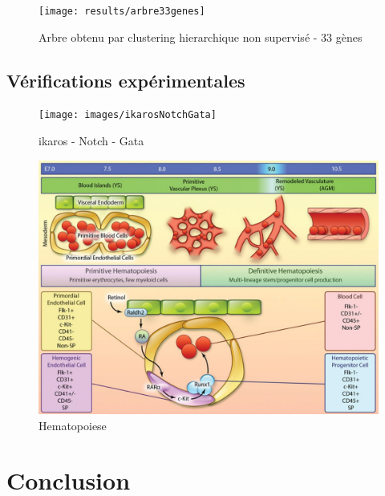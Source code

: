 \documentclass[fleqn,11pt]{SelfArx} %
\begin{document}
\begin{figure}[ht]
\centering
\texttt{[image: results/arbre33genes]}
\caption{Arbre obtenu par clustering hierarchique non supervisé - 33 gènes}
\label{fig:arbre33}
\end{figure}


\subsection{Vérifications expérimentales}

\begin{figure}[ht]
\centering
\texttt{[image: images/ikarosNotchGata]}
\caption{ikaros - Notch - Gata}
\label{fig:ikarosNotchGata}
\end{figure}


\begin{figure}[ht]
\centering
\includegraphics[width=\linewidth]{images/synthese}
\caption{Hematopoiese}
\label{fig:synthese}
\end{figure}




\newpage
\section*{Conclusion}
\end{document}
